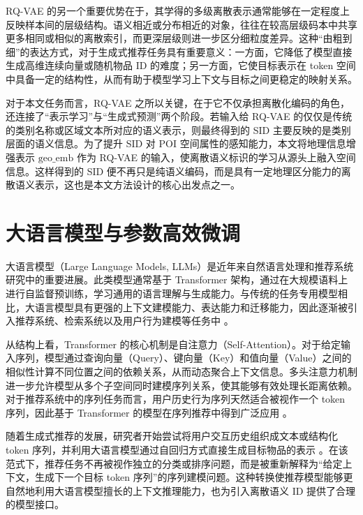 RQ-VAE 的另一个重要优势在于，其学得的多级离散表示通常能够在一定程度上反映样本间的层级结构。语义相近或分布相近的对象，往往在较高层级码本中共享更多相同或相似的离散索引，而更深层级则进一步区分细粒度差异。这种“由粗到细”的表达方式，对于生成式推荐任务具有重要意义：一方面，它降低了模型直接生成高维连续向量或随机物品 ID 的难度；另一方面，它使目标表示在 token 空间中具备一定的结构性，从而有助于模型学习上下文与目标之间更稳定的映射关系。

对于本文任务而言，RQ-VAE 之所以关键，在于它不仅承担离散化编码的角色，还连接了“表示学习”与“生成式预测”两个阶段。若输入给 RQ-VAE 的仅仅是传统的类别名称或区域文本所对应的语义表示，则最终得到的 SID 主要反映的是类别层面的语义信息。为了提升 SID 对 POI 空间属性的感知能力，本文将地理信息增强表示 $\mathrm{geo\_emb}$ 作为 RQ-VAE 的输入，使离散语义标识的学习从源头上融入空间信息。这样得到的 SID 便不再只是纯语义编码，而是具有一定地理区分能力的离散语义表示，这也是本文方法设计的核心出发点之一。

\section{大语言模型与参数高效微调}
\label{sec:llm_peft}

大语言模型（Large Language Models, LLMs）是近年来自然语言处理和推荐系统研究中的重要进展。此类模型通常基于 Transformer 架构，通过在大规模语料上进行自监督预训练，学习通用的语言理解与生成能力。与传统的任务专用模型相比，大语言模型具有更强的上下文建模能力、表达能力和迁移能力，因此逐渐被引入推荐系统、检索系统以及用户行为建模等任务中 \cite{brown2020gpt3,vaswani2017attention}。

从结构上看，Transformer 的核心机制是自注意力（Self-Attention）。对于给定输入序列，模型通过查询向量（Query）、键向量（Key）和值向量（Value）之间的相似性计算不同位置之间的依赖关系，从而动态聚合上下文信息。多头注意力机制进一步允许模型从多个子空间同时建模序列关系，使其能够有效处理长距离依赖。对于推荐系统中的序列任务而言，用户历史行为序列天然适合被视作一个 token 序列，因此基于 Transformer 的模型在序列推荐中得到广泛应用 \cite{kang2018sasrec}。

随着生成式推荐的发展，研究者开始尝试将用户交互历史组织成文本或结构化 token 序列，并利用大语言模型通过自回归方式直接生成目标物品的表示 \cite{rajput2023tiger,li2024llm4poi,wang2025gnprsid}。在该范式下，推荐任务不再被视作独立的分类或排序问题，而是被重新解释为“给定上下文，生成下一个目标 token 序列”的序列建模问题。这种转换使推荐模型能够更自然地利用大语言模型擅长的上下文推理能力，也为引入离散语义 ID 提供了合理的模型接口。

